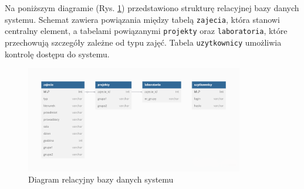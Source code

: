Na poniższym diagramie (Rys. \ref{fig:diagram-db}) przedstawiono strukturę relacyjnej bazy danych systemu. Schemat zawiera powiązania między tabelą \texttt{zajecia}, która stanowi centralny element, a tabelami powiązanymi \texttt{projekty} oraz \texttt{laboratoria}, które przechowują szczegóły zależne od typu zajęć. Tabela \texttt{uzytkownicy} umożliwia kontrolę dostępu do systemu.

\begin{figure}[H]
    \centering
    \includegraphics[width=0.85\textwidth]{figures/diagramDB.png}
    \caption{Diagram relacyjny bazy danych systemu}
    \label{fig:diagram-db}
\end{figure}
